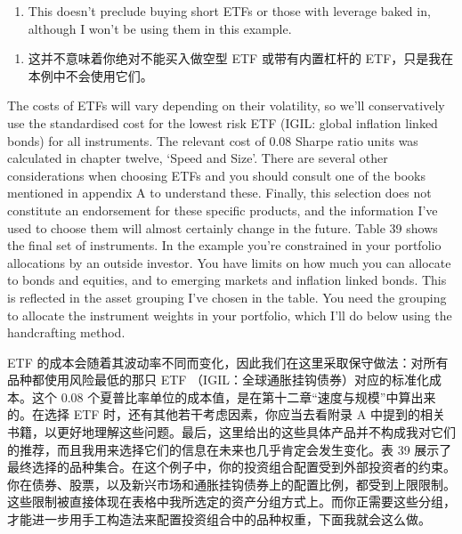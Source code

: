 \begin{enumerate}
\item This doesn't preclude buying short ETFs or those with leverage baked in, although I won't be using them in this example. \end{enumerate}

\begin{enumerate}
\item 这并不意味着你绝对不能买入做空型 ETF 或带有内置杠杆的 ETF，只是我在本例中不会使用它们。\end{enumerate}

\begin{englishblock} The costs of ETFs will vary depending on their volatility, so we'll conservatively use the standardised cost for the lowest risk ETF (IGIL: global inflation linked bonds) for all instruments. The relevant cost of 0.08 Sharpe ratio units was calculated in chapter twelve, ‘Speed and Size'. There are several other considerations when choosing ETFs and you should consult one of the books mentioned in appendix A to understand these. Finally, this selection does not constitute an endorsement for these specific products, and the information I've used to choose them will almost certainly change in the future. Table 39 shows the final set of instruments. In the example you're constrained in your portfolio allocations by an outside investor. You have limits on how much you can allocate to bonds and equities, and to emerging markets and inflation linked bonds. This is reflected in the asset grouping I've chosen in the table. You need the grouping to allocate the instrument weights in your portfolio, which I'll do below using the handcrafting method. \end{englishblock}

\begin{chineseblock} ETF 的成本会随着其波动率不同而变化，因此我们在这里采取保守做法：对所有品种都使用风险最低的那只 ETF （IGIL：全球通胀挂钩债券）对应的标准化成本。这个 0.08 个夏普比率单位的成本值，是在第十二章“速度与规模”中算出来的。在选择 ETF 时，还有其他若干考虑因素，你应当去看附录 A 中提到的相关书籍，以更好地理解这些问题。最后，这里给出的这些具体产品并不构成我对它们的推荐，而且我用来选择它们的信息在未来也几乎肯定会发生变化。表 39 展示了最终选择的品种集合。在这个例子中，你的投资组合配置受到外部投资者的约束。你在债券、股票，以及新兴市场和通胀挂钩债券上的配置比例，都受到上限限制。这些限制被直接体现在表格中我所选定的资产分组方式上。而你正需要这些分组，才能进一步用手工构造法来配置投资组合中的品种权重，下面我就会这么做。\end{chineseblock}

